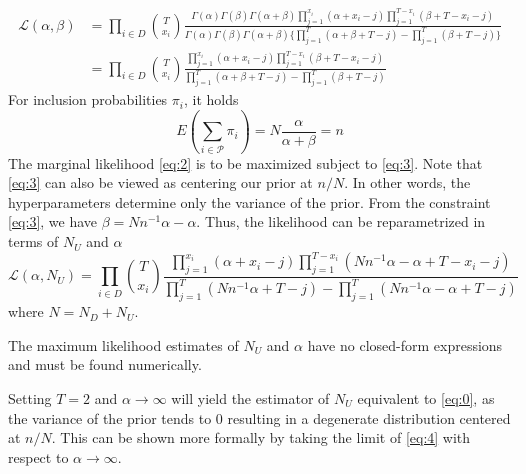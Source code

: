 \documentclass[manuscript]{biometrika}
\begin{document}
\begin{align} \label{eq:2}
    \mathcal{L}(\alpha, \beta) &= \prod_{i \in D} \binom{T}{x_i} \frac{\Gamma(\alpha)\Gamma(\beta)\Gamma(\alpha + \beta) \prod_{j=1}^{x_i} (\alpha + x_i - j)\prod_{j=1}^{T - x_i} (\beta + T - x_i - j)}{\Gamma(\alpha)\Gamma(\beta)\Gamma(\alpha + \beta)\{\prod_{j=1}^T(\alpha + \beta + T - j) - \prod_{j=1}^T (\beta + T - j)\}} \nonumber \\
    &= \prod_{i \in D} \binom{T}{x_i} \frac{\prod_{j=1}^{x_i} (\alpha + x_i - j)\prod_{j=1}^{T - x_i} (\beta + T - x_i - j)}{\prod_{j=1}^T(\alpha + \beta + T - j) - \prod_{j=1}^T (\beta + T - j)}
\end{align}
For inclusion probabilities $\pi_i$, it holds
\begin{equation} \label{eq:3}
E(\sum_{i \in \mathcal{P}} \pi_i) = N \frac{\alpha}{\alpha + \beta} = n
\end{equation}
The marginal likelihood \eqref{eq:2} is to be maximized subject to \eqref{eq:3}. Note that \eqref{eq:3} can also be viewed as centering our prior at $n / N$. In other words, the hyperparameters determine only the variance of the prior. From the constraint \eqref{eq:3}, we have $\beta = Nn^{-1}\alpha - \alpha$. Thus, the likelihood can be reparametrized in terms of $N_U$ and $\alpha$
\begin{equation} \label{eq:4}
    \mathcal{L}(\alpha, N_U) = \prod_{i \in D} \binom{T}{x_i} \frac{\prod_{j=1}^{x_i} (\alpha + x_i - j)\prod_{j=1}^{T - x_i} (Nn^{-1} \alpha - \alpha + T - x_i - j)}{\prod_{j=1}^T(Nn^{-1} \alpha + T - j) - \prod_{j=1}^T (Nn^{-1} \alpha - \alpha + T - j)}
\end{equation}
where $N = N_D + N_U$.

The maximum likelihood estimates of $N_U$ and $\alpha$ have no closed-form expressions and must be found numerically.

Setting $T = 2$ and $\alpha \to \infty$ will yield the estimator of $N_U$ equivalent to \eqref{eq:0}, as the variance of the prior tends to 0 resulting in a degenerate distribution centered at $n / N$. This can be shown more formally by taking the limit of \eqref{eq:4} with respect to $\alpha \to \infty$.
\end{document}
